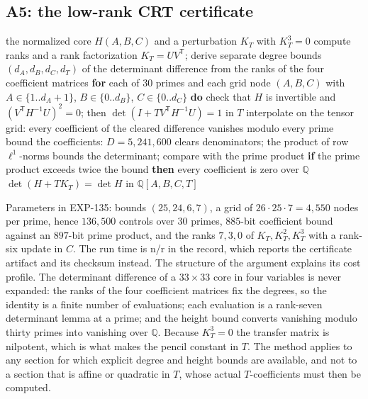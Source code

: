 \documentclass[11pt]{article}
\theoremstyle{remark}
\newcommand{\Q}{\mathbb{Q}}
\begin{document}
\subsection{A5: the low-rank CRT certificate}

\begin{algorithm}[t]
\caption{A5, the low-rank transfer certificate (EXP-135)}\label{alg:crt}
\begin{algorithmic}[1]
\Require the normalized core $H(A,B,C)$ and a perturbation $K_T$ with $K_T^3=0$
\State compute ranks and a rank factorization $K_T=UV^{\mathsf T}$; derive separate degree bounds $(d_A,d_B,d_C,d_T)$ of the determinant difference from the ranks of the four coefficient matrices
\State \textbf{for} each of $30$ primes and each grid node $(A,B,C)$ with $A\in\{1..d_A{+}1\}$, $B\in\{0..d_B\}$, $C\in\{0..d_C\}$ \textbf{do}
\State \quad check that $H$ is invertible and $(V^{\mathsf T}H^{-1}U)^2=0$; then $\det(I+TV^{\mathsf T}H^{-1}U)=1$ in $T$
\State interpolate on the tensor grid: every coefficient of the cleared difference vanishes modulo every prime
\State bound the coefficients: $D=5{,}241{,}600$ clears denominators; the product of row $\ell^1$-norms bounds the determinant; compare with the prime product
\State \textbf{if} the prime product exceeds twice the bound \textbf{then} every coefficient is zero over $\Q$
\Ensure $\det(H+TK_T)=\det H$ in $\Q[A,B,C,T]$
\end{algorithmic}
\end{algorithm}

Parameters in EXP-135: bounds $(25,24,6,7)$, a grid of $26\cdot25\cdot7=4{,}550$ nodes per prime, hence
$136{,}500$ controls over $30$ primes, $885$-bit coefficient bound against an $897$-bit prime product, and the
ranks $7,3,0$ of $K_T,K_T^2,K_T^3$ with a rank-six update in $C$. The run time is n/r in the record, which
reports the certificate artifact and its checksum instead. The structure of the argument explains its cost profile. The
determinant difference of a $33\times33$ core in four variables is never expanded: the ranks of the four coefficient matrices fix the
degrees, so the identity is a finite number of evaluations; each evaluation is a rank-seven determinant lemma at a prime; and the
height bound converts vanishing modulo thirty primes into vanishing over $\Q$. Because $K_T^3=0$ the transfer matrix is nilpotent, which is
what makes the pencil constant in $T$. The method applies to any section for which explicit degree and height bounds are available, and not to a
section that is affine or quadratic in $T$, whose actual $T$-coefficients must then be computed.
\end{document}

